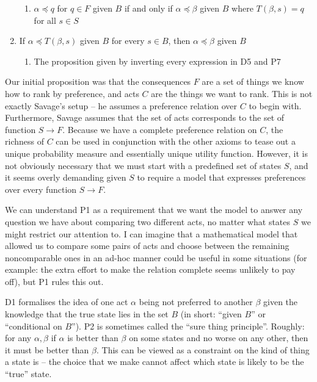 \begin{enumerate}[P1:]
    \begin{enumerate}[D5:]
        \item $\alpha\preceq q$ for $q\in F$ given $B$ if and only if $\alpha\preceq \beta$ given $B$ where $T(\beta,s)=q$ for all $s\in S$
    \end{enumerate}
    \item If $\alpha\preceq T(\beta,s)$ given $B$ for every $s\in B$, then $\alpha\preceq \beta$ given $B$
    \begin{enumerate}[P7':]
        \item The proposition given by inverting every expression in D5 and P7
    \end{enumerate}
\end{enumerate}

Our initial proposition was that the consequences $F$ are a set of things we know how to rank by preference, and acts $C$ are the things we want to rank. This is not exactly Savage's setup -- he assumes a preference relation over $C$ to begin with. Furthermore, Savage assumes that the set of acts corresponds to the set of function $S\to F$. Because we have a complete preference relation on $C$, the richness of $C$ can be used in conjunction with the other axioms to tease out a unique probability measure and essentially unique utility function. However, it is not obviously necessary that we must start with a predefined set of states $S$, and it seems overly demanding given $S$ to require a model that expresses preferences over every function $S\to F$. 

We can understand P1 as a requirement that we want the model to answer any question we have about comparing two different acts, no matter what states $S$ we might restrict our attention to. I can imagine that a mathematical model that allowed us to compare some pairs of acts and choose between the remaining noncomparable ones in an ad-hoc manner could be useful in some situations (for example: the extra effort to make the relation complete seems unlikely to pay off), but P1 rules this out.

D1 formalises the idea of one act $\alpha$ being not preferred to another $\beta$ given the knowledge that the true state lies in the set $B$ (in short: ``given $B$'' or ``conditional on $B$''). P2 is sometimes called the ``sure thing principle''. Roughly: for any $\alpha, \beta$ if $\alpha$ is better than $\beta$ on some states and no worse on any other, then it must be better than $\beta$. This can be viewed as a constraint on the kind of thing a state is -- the choice that we make cannot affect which state is likely to be the ``true'' state.

